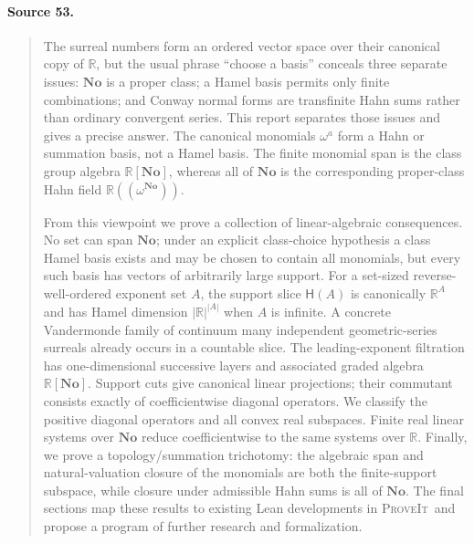\documentclass[11pt,letterpaper]{article}
\numberwithin{equation}{section}
\theoremstyle{definition}
\theoremstyle{remark}
\newcommand{\No}{\mathbf{No}}
\newcommand{\Hahn}{\mathsf{H}}
\newcommand{\repo}{\textsc{ProveIt}}
\begin{document}
\paragraph{Source 53.}
\begin{quote}\small

The surreal numbers form an ordered vector space over their canonical copy of
$\mathbb R$, but the usual phrase ``choose a basis'' conceals three separate
issues: $\No$ is a proper class; a Hamel basis permits only finite combinations;
and Conway normal forms are transfinite Hahn sums rather than ordinary convergent
series. This report separates those issues and gives a precise answer. The
canonical monomials $\omega^a$ form a Hahn or summation basis, not a Hamel basis.
The finite monomial span is the class group algebra $\mathbb R[\No]$, whereas
all of $\No$ is the corresponding proper-class Hahn field
$\mathbb R((\omega^{\No}))$.

From this viewpoint we prove a collection of linear-algebraic consequences.
No set can span $\No$; under an explicit class-choice hypothesis a class Hamel
basis exists and may be chosen to contain all monomials, but every such basis has
vectors of arbitrarily large support. For a set-sized reverse-well-ordered exponent
set $A$, the support slice $\Hahn(A)$ is canonically $\mathbb R^A$ and has Hamel
dimension $|\mathbb R|^{|A|}$ when $A$ is infinite. A concrete Vandermonde family
of continuum many independent geometric-series surreals already occurs in a
countable slice. The leading-exponent filtration has one-dimensional successive
layers and associated graded algebra $\mathbb R[\No]$. Support cuts give canonical
linear projections; their commutant consists exactly of coefficientwise diagonal
operators. We classify the positive diagonal operators and all convex real
subspaces. Finite real linear systems over $\No$ reduce coefficientwise to the
same systems over $\mathbb R$. Finally, we prove a topology/summation trichotomy:
the algebraic span and natural-valuation closure of the monomials are both the
finite-support subspace, while closure under admissible Hahn sums is all of $\No$.
The final sections map these results to existing Lean developments in \repo\ and
propose a program of further research and formalization.
\end{quote}
\end{document}
